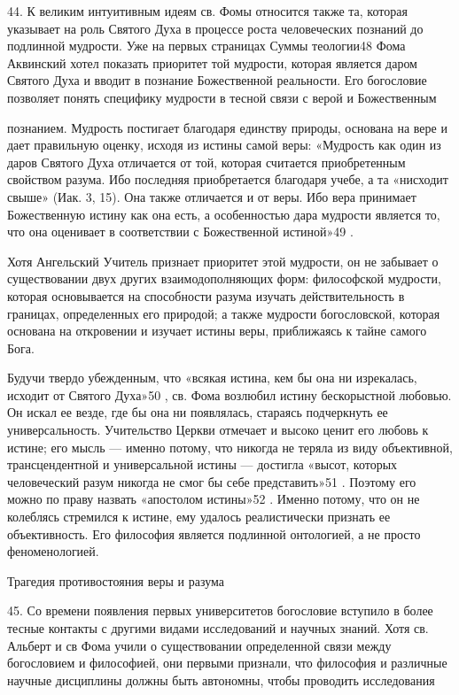 \documentclass[a5paper,10pt]{article}
\begin{document}
44. К великим интуитивным идеям св. Фомы относится также та, которая указывает
на роль Святого Духа в процессе роста человеческих познаний до подлинной
мудрости. Уже на первых страницах Суммы теологии48 Фома Аквинский хотел
показать приоритет той мудрости, которая является даром Святого Духа и вводит в
познание Божественной реальности. Его богословие позволяет понять специфику
мудрости в тесной связи с верой и Божественным

познанием. Мудрость постигает благодаря единству природы, основана на вере и
дает правильную оценку, исходя из истины самой веры: «Мудрость как один из
даров Святого Духа отличается от той, которая считается приобретенным свойством
разума. Ибо последняя приобретается благодаря учебе, а та «нисходит свыше»
(Иак. 3, 15). Она также отличается и от веры. Ибо вера принимает Божественную
истину как она есть, а особенностью дара мудрости является то, что она
оценивает в соответствии с Божественной истиной»49 .

Хотя Ангельский Учитель признает приоритет этой мудрости, он не забывает о
существовании двух других взаимодополняющих форм: философской мудрости, которая
основывается на способности разума изучать действительность в границах,
определенных его природой; а также мудрости богословской, которая основана на
откровении и изучает истины веры, приближаясь к тайне самого Бога.

Будучи твердо убежденным, что «всякая истина, кем бы она ни изрекалась, исходит
от Святого Духа»50 , св. Фома возлюбил истину бескорыстной любовью. Он искал ее
везде, где бы она ни появлялась, стараясь подчеркнуть ее универсальность.
Учительство Церкви отмечает и высоко ценит его любовь к истине; его мысль —
именно потому, что никогда не теряла из виду объективной, трансцендентной и
универсальной истины — достигла «высот, которых человеческий разум никогда не
смог бы себе представить»51 . Поэтому его можно по праву назвать «апостолом
истины»52 . Именно потому, что он не колеблясь стремился к истине, ему удалось
реалистически признать ее объективность. Его философия является подлинной
онтологией, а не просто феноменологией.

Трагедия противостояния веры и разума

45. Со времени появления первых университетов богословие вступило в более
тесные контакты с другими видами исследований и научных знаний. Хотя св.
Альберт и св Фома учили о существовании определенной связи между богословием и
философией, они первыми признали, что философия и различные научные дисциплины
должны быть автономны, чтобы проводить исследования
\end{document}
